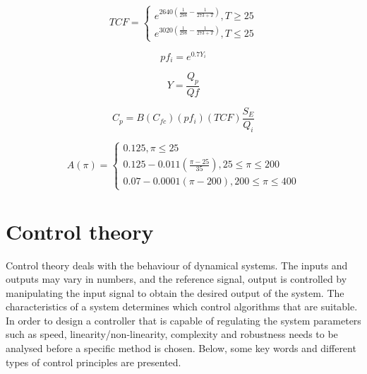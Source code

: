 \begin{equation}
\label{eq:TCF}
TCF =
\begin{cases}
e^{2640(\frac{1}{298}- \frac{1}{273+T})} , T\geq25 \\
e^{3020(\frac{1}{298}- \frac{1}{273+T})} , T\leq25
\end{cases}
\end{equation}

\begin{equation}
\label{eq:polfac}
pf_{i} = e^{0.7Y_{i}}
\end{equation}

\begin{equation}
\label{eq:recov}
Y= \frac{Q_{p}}{Q{f}}
\end{equation}

\begin{equation}
\label{eq:permC}
C_{p}=B(C_{fc})({pf_{i}})(TCF)\frac{S_{E}}{Q_{i}}
\end{equation}

\begin{equation}
\label{eq:permability}
A(\pi) =
\begin{cases} 
0.125 , \pi \leq 25 \\
0.125-0.011(\frac{\pi - 25}{35}) , 25 \leq \pi \leq 200 \\ 
0.07-0.0001(\pi-200) , 200 \leq \pi \leq 400  
\end{cases}
\end{equation}

\section{Control theory}
Control theory deals with the behaviour of dynamical systems. The inputs and outputs may vary in numbers, and the reference signal, output is controlled by manipulating the input signal to obtain the desired output of the system. The characteristics of a system determines which control algorithms that are suitable. In order to design a controller that is capable of regulating the system parameters such as speed, linearity/non-linearity, complexity and robustness needs to be analysed before a specific method is chosen. Below, some key words and different types of control principles are presented. \\
\\


